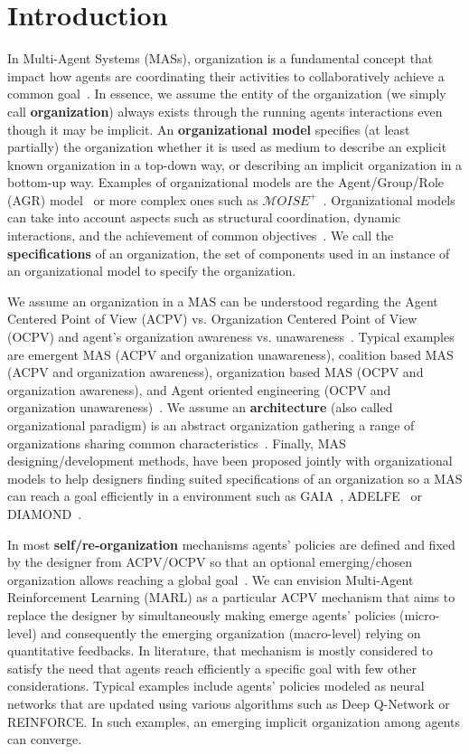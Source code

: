 \documentclass[runningheads]{llncs}
\begin{document}
\section{Introduction}

In Multi-Agent Systems (MASs), organization is a fundamental concept that impact how agents are coordinating their activities to collaboratively achieve a common goal~\cite{Hubner2002}. In essence, we assume the entity of the organization (we simply call \textbf{organization}) always exists through the running agents interactions even though it may be implicit.
An \textbf{organizational model} specifies (at least partially) the organization whether it is used as medium to describe an explicit known organization in a top-down way, or describing an implicit organization in a bottom-up way. Examples of organizational models are the Agent/Group/Role (AGR) model~\cite{Ferber2004} or more complex ones such as $\mathcal{M}OISE^{+}$~\cite{Hubner2002}. Organizational models can take into account aspects such as structural coordination, dynamic interactions, and the achievement of common objectives~\cite{Ferber2004, Abbas2015}. We call the \textbf{specifications} of an organization, the set of components used in an instance of an organizational model to specify the organization.

We assume an organization in a MAS can be understood regarding the Agent Centered Point of View (ACPV) vs. Organization Centered Point of View (OCPV) and agent's organization awareness vs. unawareness~\cite{Picard2009}.
Typical examples are emergent MAS (ACPV and organization unawareness), coalition based MAS (ACPV and organization awareness), organization based MAS (OCPV and organization awareness), and Agent oriented engineering (OCPV and organization unawareness)~\cite{Picard2009}.
We assume an \textbf{architecture} (also called organizational paradigm) is an abstract organization gathering a range of organizations sharing common characteristics~\cite{Horling2004}. Finally, MAS designing/development methods, have been proposed jointly with organizational models to help designers finding suited specifications of an organization so a MAS can reach a goal efficiently in a environment such as GAIA~\cite{Wooldridge2000}, ADELFE~\cite{Bernon2003} or DIAMOND~\cite{Jamont2005}.

In most \textbf{self/re-organization} mechanisms agents' policies are defined and fixed by the designer from ACPV/OCPV so that an optional emerging/chosen organization allows reaching a global goal~\cite{Picard2009}. We can envision Multi-Agent Reinforcement Learning (MARL) as a particular ACPV mechanism that aims to replace the designer by simultaneously making emerge agents' policies (micro-level) and consequently the emerging organization (macro-level) relying on quantitative feedbacks. In literature, that mechanism is mostly considered to satisfy the need that agents reach efficiently a specific goal with few other considerations. Typical examples include agents' policies modeled as neural networks that are updated using various algorithms such as Deep Q-Network or REINFORCE. In such examples, an emerging implicit organization among agents can converge.
\end{document}
